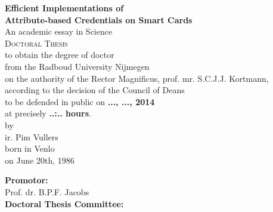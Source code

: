 \begin{center}
  \thispagestyle{empty}

  \textbf{\Large Efficient Implementations of\\ Attribute-based Credentials on Smart Cards}\\[15mm]

  An academic essay in Science \\[15mm]

  \textsc{Doctoral Thesis} \\[15mm]

  to obtain the degree of doctor \\
  from the Radboud University Nijmegen \\
  on the authority of the Rector Magnificus, prof. mr. S.C.J.J. Kortmann, \\
  according to the decision of the Council of Deans \\
  to be defended in public on \textbf{..., ..., 2014} \\
  at precisely \textbf{..:.. hours}. \\[30mm]

  by \\[30mm]

  ir. Pim Vullers \\[15mm]

  born in Venlo \\
  on June 20th, 1986
\end{center}

\clearpage

\begin{flushleft}
  \thispagestyle{empty}

  \textbf{Promotor:} \\
  \indent Prof. dr. B.P.F. Jacobs \\[15mm]

  \textbf{Doctoral Thesis Committee:}
\end{flushleft}